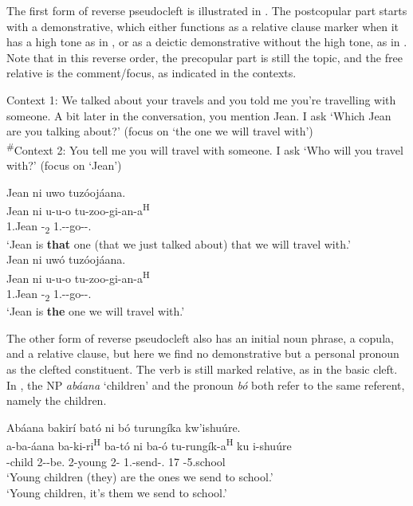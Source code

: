 \documentclass[output=paper]{langscibook}
\begin{document}
The first form of reverse pseudocleft is illustrated in . The postcopular part starts with a demonstrative, which either functions as a relative clause marker when it has a high tone as in , or as a deictic demonstrative without the high tone, as in . Note that in this reverse order, the precopular part is still the topic, and the free relative is the comment/focus, as indicated in the contexts.

\ea
\label{bkm:Ref118966697}
Context 1: We talked about your travels and you told me you’re travelling with someone. A bit later in the conversation, you mention Jean. I ask ‘Which Jean are you talking about?’ (focus on ‘the one we will travel with’)\\
\textsuperscript{\#}Context 2: You tell me you will travel with someone. I ask ‘Who will you travel with?’ (focus on ‘Jean’)

\ea
\label{bkm:Ref118966697:a}
Jean ni uwo tuzóojáana.\\
\gll
Jean  ni  u-u-o  tu-zoo-gi-an-a\textsuperscript{H}\\
1.Jean  \COP{}  -\DEM{}\textsubscript{2}  1\PL.\SM-\FUT{}-go-\ASS{}-\FV.\REL{}\\
\glt
‘Jean is \textbf{that} one (that we just talked about) that we will travel with.’\\

\ex
\label{bkm:Ref118966697:b}
Jean ni uwó tuzóojáana.\\
\gll
Jean  ni  u-u-o  tu-zoo-gi-an-a\textsuperscript{H}\\
1.Jean  \COP{}  -\DEM{}\textsubscript{2}  1\PL.\SM-\FUT{}-go-\ASS{}-\FV.\REL{}\\
\glt
‘Jean is \textbf{the} one we will travel with.’\\

\z
\z

The other form of reverse pseudocleft also has an initial noun phrase, a copula, and a relative clause, but here we find no demonstrative but a personal pronoun as the clefted constituent. The verb is still marked relative, as in the basic cleft. In , the NP \textit{abáana} ‘children’ and the pronoun \textit{bó} both refer to the same referent, namely the children.

\ea
\label{bkm:Ref78803758}
Abáana bakirí bató ni bó turungíka kw’ishuúre.\\
\gll
a-ba-áana  ba-ki-ri\textsuperscript{H}  ba-tó  ni  ba-ó  tu-rungík-a\textsuperscript{H} ku  i-shuúre\\
-{}child  2\SM-\PERS{}-be.\REL{}  2-young  \COP{}  2-\PRO{}  1\PL.\SM{}-send-\FV.\REL{}  17  \AUG{}-5.school\\
\glt
‘Young children (they) are the ones we send to school.’\\
‘Young children, it’s them we send to school.’
\end{document}
